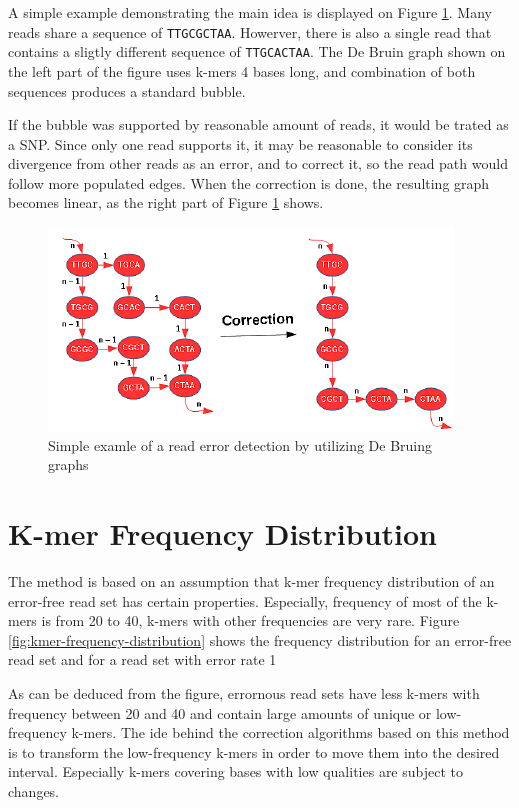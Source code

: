 A simple example demonstrating the main idea is displayed on Figure \ref{fig:error-correction-db}. Many reads share a sequence of \texttt{TTGCGCTAA}. Howerver, there is also a single read that contains a sligtly different sequence of \texttt{TTGCACTAA}. The De Bruin graph shown on the left part of the figure uses k-mers 4 bases long, and combination of both sequences produces a standard bubble.

If the bubble was supported by reasonable amount of reads, it would be trated as a SNP. Since only one read supports it, it may be reasonable to consider its divergence from other reads as an error, and to correct it, so the read path would follow more populated edges. When the correction is done, the resulting graph becomes linear, as the right part of Figure \ref{fig:error-correction-db} shows.

\begin{figure}[h]
	\centering
	\includegraphics{img/error-correction-db.pdf}
	\caption{Simple examle of a read error detection by utilizing De Bruing graphs}
	\label{fig:error-correction-db}
\end{figure}

\section{K-mer Frequency Distribution}
\label{sec:ec-kmer-frequency-distribution}

The method is based on an assumption that k-mer frequency distribution of an error-free read set has certain properties. Especially, frequency of most of the k-mers is from 20 to 40, k-mers with other frequencies are very rare. Figure \ref{fig:kmer-frequency-distribution} shows the frequency distribution for an error-free read set and for a read set with error rate 1 %

As can be deduced from the figure, errornous read sets have less k-mers with frequency between 20 and 40 and contain large amounts of unique or low-frequency k-mers. The ide behind the correction algorithms based on this method is to transform the low-frequency k-mers in order to move them into the desired interval. Especially k-mers covering bases with low qualities are subject to changes.

